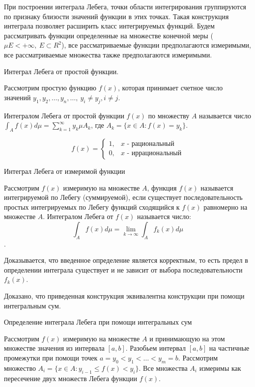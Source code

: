 \documentclass[14pt,a4paper]{extarticle}
\theoremstyle{definition}
\theoremstyle{remark}
\renewcommand{\[}{\begin{dmath*}[compact]}
\renewcommand{\]}{\end{dmath*}}
\newcommand{\sep}{ , \ \allowbreak }
\begin{document}
При построении интеграла Лебега, точки области интегрирования группируются по признаку близости значений функции в этих точках. Такая конструкция интеграла позволяет расширить класс интегрируемых функций. Будем рассматривать функции определенные на множестве конечной меры ($\mu E < +\infty \sep E \subset R^2$), все рассматриваемые функции предполагаются измеримыми, все рассматриваемые множества также предполагаются измеримыми.

Интеграл Лебега от простой функции.

Рассмотрим простую функцию $f(x)$, которая принимает счетное число значений $y_1, y_2, \dots, y_n, \dots \sep y_i \neq y_j, i\neq j$.

Интегралом Лебега от простой функции $f(x)$ по множеству $A$ называется число $\int_A f(x) d\mu = \sum_{k=1}^\infty y_k\mu A_k$, где $A_k=\{x\in A:f(x)=y_k\}$.

\[f(x) = \begin{cases} 1, & x\text{ - рациональный} \\ 0, & x\text{ - иррациональный} \end{cases}\]

Интеграл Лебега от измеримой функции

Рассмотрим $f(x)$ измеримую на множестве $A$, функция $f(x)$ называется интегрируемой по Лебегу (суммируемой), если существует последовательность простых интегрируемых по Лебегу функций сходящийся к $f(x)$ равномерно на множестве $A$. Интегралом Лебега от $f(x)$ называется число:
\[\int_A f(x) d\mu = \lim_{k \to \infty} \int_A f_k(x) d\mu\].

Доказывается, что введенное определение является корректным, то есть предел в определении интеграла существует и не зависит от выбора последовательности $f_k(x)$.

Доказано, что приведенная конструкция эквивалентна конструкции при помощи интегральным сум.

Определение интеграла Лебега при помощи интегральных сум

Рассмотрим $f(x)$ измеримую на множестве $A$ и принимающую на этом множестве значения из интервала $[a,b]$. Разобьем интервал $[a,b]$ на частичные промежутки при помощи точек $a=y_0 < y_1 < \dots < y_m = b$. Рассмотрим множество $A_i = \{x \in A: y_{i-1} \leq f(x) < y_i\}$. Все множества $A_i$ измеримы как пересечение двух множеств Лебега функции $f(x)$.
\end{document}
